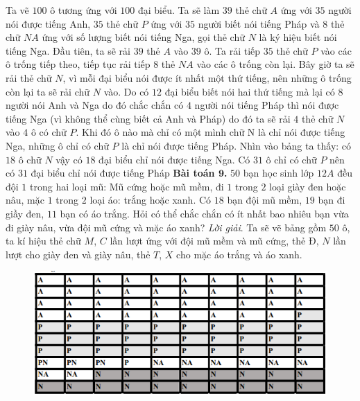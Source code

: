 \begin{multicols}{2}
\begin{figure}[H]
		\vspace*{-15pt}
	\end{figure}
	Ta vẽ $100$ ô tương ứng với $100$ đại biểu. Ta sẽ làm $39$ thẻ chữ $A$ ứng với $35$ người nói được tiếng Anh, $35$ thẻ chữ $P$ ứng với $35$ người biết nói tiếng Pháp và $8$ thẻ chữ $NA$ ứng với số lượng biết nói tiếng Nga, gọi thẻ chữ $N$ là ký hiệu biết nói tiếng Nga.
	\vskip 0.1cm
	Đầu tiên, ta sẽ rải $39$ thẻ $A$ vào $39$ ô. Ta rải tiếp $35$ thẻ chữ $P$ vào các ô trống tiếp theo, tiếp tục rải tiếp $8$ thẻ $NA$ vào các ô trống còn lại. Bây giờ ta sẽ rải thẻ chữ $N$, vì mỗi đại biểu nói được ít nhất một thứ tiếng, nên những ô trống còn lại ta sẽ rải chữ $N$ vào. Do có $12$ đại biểu biết nói hai thứ tiếng mà lại có $8$ người nói Anh và Nga do đó chắc chắn có $4$ người nói tiếng Pháp thì nói được tiếng Nga (vì không thể cùng biết cả Anh và Pháp) do đó ta sẽ rải $4$ thẻ chữ $N$ vào $4$ ô có chữ $P$. Khi đó ô nào mà chỉ có một mình chữ N là chỉ nói được tiếng Nga, những ô chỉ có chữ $P$ là chỉ nói được tiếng Pháp. Nhìn vào bảng ta thấy: có $18$ ô chữ $N$ vậy có $18$ đại biểu chỉ nói được tiếng Nga. Có $31$ ô chỉ có chữ $P$ nên có $31$ đại biểu chỉ nói được tiếng Pháp
	\vskip 0.1cm
	\textbf{\color{diendantoanhoc}Bài toán $\pmb9$.}
	\vskip 0.1cm
	$50$ bạn học sinh lớp $12A$ đều đội $1$ trong hai loại mũ: Mũ cứng hoặc mũ mềm, đi $1$ trong $2$ loại giày đen hoặc nâu, mặc $1$ trong $2$ loại áo: trắng hoặc xanh. Có $18$ bạn đội mũ mềm, $19$ bạn đi giầy đen, $11$ bạn có áo trắng. Hỏi có thể chắc chắn có ít nhất bao nhiêu bạn vừa đi giày nâu, vừa đội mũ cứng và mặc áo xanh?
	\vskip 0.1cm
	\textit{Lời giải}.
	Ta sẽ vẽ bảng gồm $50$ ô, ta kí hiệu thẻ chữ $M$, $C$ lần lượt ứng với đội mũ mềm và mũ cứng, thẻ $Đ$, $N$ lần lượt cho giày đen và giày nâu, thẻ $T$, $X$ cho mặc áo trắng và áo xanh.
	\begin{figure}[H]
		\vspace*{-5pt}
		\centering
		\captionsetup{labelformat= empty, justification=centering}
		\includegraphics[width= 1\linewidth]{9}

\end{figure}
\end{multicols}

